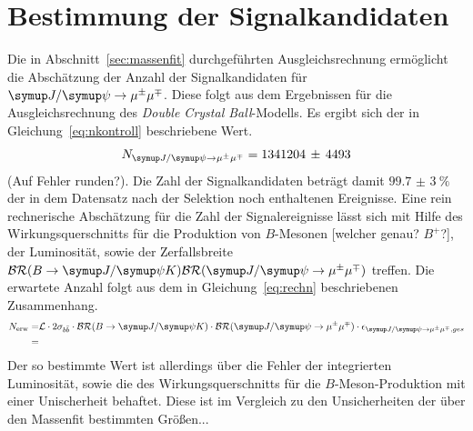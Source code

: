\section{Bestimmung der Signalkandidaten}
Die in Abschnitt~\ref{sec:massenfit} durchgeführten Ausgleichsrechnung ermöglicht die Abschätzung der Anzahl der Signalkandidaten für $\kontroll$. Diese folgt aus dem Ergebnissen für die Ausgleichsrechnung des \textit{Double Crystal Ball}-Modells. Es ergibt sich der in Gleichung~\eqref{eq:nkontroll} beschriebene Wert.
%
\begin{equation}
  N_{\kontroll}=1341204\,\pm\,4493
  \label{eq:nkontroll}
\end{equation}
%
(Auf Fehler runden?). Die Zahl der Signalkandidaten beträgt damit $\SI{99,7(3)}{\percent}$ der in dem Datensatz nach der Selektion noch enthaltenen Ereignisse.
Eine rein rechnerische Abschätzung für die Zahl der Signalereignisse lässt sich mit Hilfe des Wirkungsquerschnitts für die Produktion von $B$-Mesonen [welcher genau? $B^{+}$?], der Luminosität, sowie der Zerfallsbreite $\mathcal{BR}(B\rightarrow\jpsi K)\mathcal{BR}(\kontroll)$ treffen. Die erwartete Anzahl folgt aus dem in Gleichung~\eqref{eq:rechn} beschriebenen Zusammenhang.
%
\begin{equation}
  \begin{split}
    N_\text{erw}=&\mathcal{L}\cdot 2\sigma_{b\bar{b}}\cdot\mathcal{BR}(B\rightarrow\jpsi K)\cdot\mathcal{BR}(\kontroll)\cdot\epsilon_{\kontroll, ges}\\
    =&
  \end{split}
  \label{eq:rechn}
\end{equation}
%
Der so bestimmte Wert ist allerdings über die Fehler der integrierten Luminosität, sowie die des Wirkungsquerschnitts für die $B$-Meson-Produktion mit einer Unischerheit behaftet. Diese ist im Vergleich zu den Unsicherheiten der über den Massenfit bestimmten Größen...

